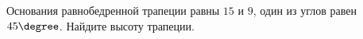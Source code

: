 \begin{ex}
	\begin{condition}
		Основания равнобедренной трапеции равны \( 15  \) и \( 9 \), один из углов равен \( 45  \degree\). Найдите высоту трапеции.
	\end{condition}
\end{ex}